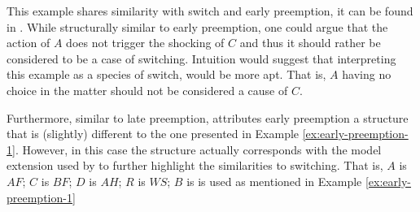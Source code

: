 \documentclass[11pt,a4paper]{book}
\theoremstyle{definition}
\theoremstyle{definition}
\theoremstyle{definition}
\theoremstyle{remark}
\begin{document}
 This example shares similarity with switch and early preemption, it can be found in \parencite{weslake2015partial,bochman2018actual}. 
 While structurally similar to early preemption, one could argue that the action of $A$ does not trigger the shocking of $C$ and thus it should rather be considered to be a case of switching. 
 Intuition would suggest that interpreting this example as a species of switch, would be more apt. That is, $A$ having no choice in the matter should not be considered a cause of $C$.


Furthermore, similar to late preemption, \parencite{baumgartner2013regularity} attributes early preemption a structure that is (slightly) different to the one presented in Example \ref{ex:early-preemption-1}.
However, in this case the structure actually corresponds with the model extension used by \parencite{denecker2019explaining} to further highlight the similarities to switching.
That is, $A$ is $AF$;  $C$ is $BF$; $D$ is $AH$; $R$ is $WS$; $B$ is is used as mentioned in Example \ref{ex:early-preemption-1}
\begin{center}
\end{center}
\end{document}

